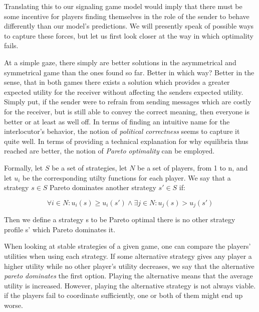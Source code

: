 \documentclass[10]{article}
\begin{document}
Translating this to our signaling game model would imply that there must be some incentive for players finding themselves in the role of the sender to behave differently than our model's predictions. We will presently speak of possible ways to capture these forces, but let us first look closer at the way in which optimality fails.

At a simple gaze, there simply are better solutions in the asymmetrical and symmetrical game than the ones found so far. Better in which way? Better in the sense, that in both games there exists a solution which provides a greater expected utility for the receiver without affecting the senders expected utility. Simply put, if the sender were to refrain from sending messages which are costly for the receiver, but is still able to convey the correct meaning, then everyone is better or at least as well off. In terms of finding an intuitive name for the interlocutor's behavior, the notion of \textit{political correctness} seems to capture it quite well. In terms of providing a technical explanation for why equilibria thus reached are better, the notion of \textit{Pareto optimality} can be employed. 

Formally, let $S$ be a set of strategies, let $N$ be a set of players, from 1 to n, and let $u_i$ be the corresponding utilty functions for each player. We say that a strategy $s \in S$ Pareto dominates another strategy $s' \in S$ if:

\begin{equation*}
\forall i \in N: u_i(s) \geq u_i(s') \land \exists j \in N: u_j(s) > u_j(s')
\end{equation*}

Then we define a strategy s to be Pareto optimal there is no other strategy profile s' which Pareto dominates it. %


When looking at stable strategies of a given game, one can compare the players' utilities when using each strategy. If some alternative strategy gives any player a higher utility while no other player's utility decreases, we say that the alternative \textit{pareto dominates} the first option. Playing the alternative means that the average utility is increased. However, playing the alternative strategy is not always viable. if the players fail to coordinate sufficiently, one or both of them might end up worse. 
\end{document}
